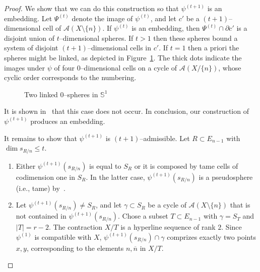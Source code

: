 \documentclass[a4paper]{amsart}
\newcommand{\p}{\mathbb S}
\renewcommand{\d}{\partial}
\theoremstyle{definition}
\theoremstyle{remark}
\begin{document}
\begin{proof}
  We show that we can do this construction so that $\psi^{(t+1)}$ is an
  embedding.  Let $\Psi^{(t)}$ denote the image of $\psi^{(t)}$, and let
  $c'$ be a $(t+1)$--dimensional cell of $\mathcal A(X\setminus \{n\})$.
  If $\psi^{(t)}$ is an embedding, then $\Psi^{(t)}\cap \d c'$ is a disjoint
  union of $t$--dimensional spheres. If $t>1$ then these spheres bound
  a system of disjoint $(t+1)$--dimensional cells in $c'$. If $t=1$ then
  a priori the spheres might be linked, as depicted in
  Figure~\ref{fig:linked}. The thick dots indicate the images under $\psi$ of
  four $0$--dimensional cells on a cycle of $\mathcal A(X/\{n\})$, 
  whose cyclic order corresponds to the numbering.
  \begin{figure}[htbp]
    \begin{center}
      \caption{Two linked $0$--spheres in $\p^1$}
      \label{fig:linked}
    \end{center}
  \end{figure}
  It is shown in~\cite{bokowskimockstreinu} 
  that this case does not occur.
  In conclusion, our construction of $\psi^{(t+1)}$ produces an
  embedding.

  It remains to show that $\psi^{(t+1)}$ is $(t+1)$--admissible. Let
  $R\subset E_{n-1}$ with $\dim s_{R/n} \le t$.
  \begin{enumerate}
  \item Either $\psi^{(t+1)}(s_{R/n})$ is equal to $S_R$ or it is
    composed by tame cells of codimension one in $S_R$. In the latter
    case, $\psi^{(t+1)}(s_{R/n})$ is a pseudosphere (i.e., tame)
    by~\cite{kirby}.
  \item Let $\psi^{(t+1)}(s_{R/n})\not=S_R$, and let $\gamma\subset S_R$
    be a cycle of $\mathcal A(X\setminus \{n\})$ that is not contained
    in $\psi^{(t+1)}(s_{R/n})$. 
    Chose a subset $T\subset E_{n-1}$ with $\gamma = S_T$ and $|T|=
    r-2$.  
%
    The contraction $X/T$ is a hyperline sequence of rank $2$. 
    Since $\psi^{(1)}$ is compatible with $X$,
    $\psi^{(t+1)}(s_{R/n})\cap \gamma$ comprizes exactly two points
    $x,y$, corresponding to the elements $n,\overline n$ in $X/T$.
    

\end{enumerate}
\end{proof}
\end{document}
